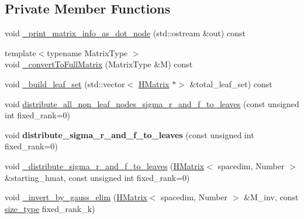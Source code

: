 \subsection*{Private Member Functions}
\begin{DoxyCompactItemize}
\item 
void \hyperlink{classHMatrix_afd8e08ec263ea524bef3c5c66796c61d}{\+\_\+print\+\_\+matrix\+\_\+info\+\_\+as\+\_\+dot\+\_\+node} (std\+::ostream \&out) const
\item 
{\footnotesize template$<$typename Matrix\+Type $>$ }\\void \hyperlink{classHMatrix_ab55b568236ffdd71b5378ac6c6ace50a}{\+\_\+convert\+To\+Full\+Matrix} (Matrix\+Type \&M) const
\item 
void \hyperlink{classHMatrix_a60934e84cc3c9f6c75d011a2005f512a}{\+\_\+build\+\_\+leaf\+\_\+set} (std\+::vector$<$ \hyperlink{classHMatrix}{H\+Matrix} $\ast$$>$ \&total\+\_\+leaf\+\_\+set) const
\item 
void \hyperlink{classHMatrix_a66979dbdf56155c63f0706649e8545b9}{distribute\+\_\+all\+\_\+non\+\_\+leaf\+\_\+nodes\+\_\+sigma\+\_\+r\+\_\+and\+\_\+f\+\_\+to\+\_\+leaves} (const unsigned int fixed\+\_\+rank=0)
\item 
\mbox{\label{classHMatrix_a39e24569fe32027c840b160f9dcd1ad7}} 
void {\bfseries distribute\+\_\+sigma\+\_\+r\+\_\+and\+\_\+f\+\_\+to\+\_\+leaves} (const unsigned int fixed\+\_\+rank=0)
\item 
void \hyperlink{classHMatrix_a187e0c009a7c28679df7e92e0b01929c}{\+\_\+distribute\+\_\+sigma\+\_\+r\+\_\+and\+\_\+f\+\_\+to\+\_\+leaves} (\hyperlink{classHMatrix}{H\+Matrix}$<$ spacedim, Number $>$ \&starting\+\_\+hmat, const unsigned int fixed\+\_\+rank=0)
\item 
void \hyperlink{classHMatrix_af74e3b0c19e9178cfe699a6620a51170}{\+\_\+invert\+\_\+by\+\_\+gauss\+\_\+elim} (\hyperlink{classHMatrix}{H\+Matrix}$<$ spacedim, Number $>$ \&M\+\_\+inv, const \hyperlink{classHMatrix_a5ca8dc549783d38371a01ecd621ecb34}{size\+\_\+type} fixed\+\_\+rank\+\_\+k)
\end{DoxyCompactItemize}
